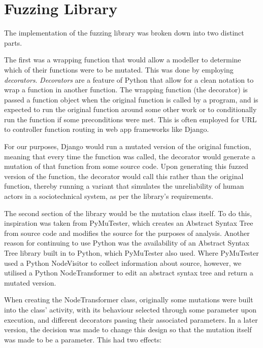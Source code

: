 \section{Fuzzing Library}
\label{planning_fuzzing_implementation} %
The implementation of the fuzzing library was broken down into two distinct parts. \par
The first was a wrapping function that would allow a modeller to determine which of their functions were to be mutated. This was done by employing \emph{decorators}. \emph{Decorators} are a feature of Python that allow for a clean notation to wrap a function in another function. The wrapping function (the decorator) is passed a function object when the original function is called by a program, and is expected to run the original function around some other work or to conditionally run the function if some preconditions were met. This is often employed for URL to controller function routing in web app frameworks like Django. \par%
For our purposes, Django would run a mutated version of the original function, meaning that every time the function was called, the decorator would generate a mutation of that function from some source code. Upon generating this fuzzed version of the function, the decorator would call this rather than the original function, thereby running a variant that simulates the unreliability of human actors in a sociotechnical system, as per the library's requirements. \par
The second section of the library would be the mutation class itself. To do this, inspiration was taken from PyMuTester, which creates an Abstract Syntax Tree from source code and modifies the source for the purposes of analysis. Another reason for continuing to use Python was the availability of an Abstract Syntax Tree library built in to Python, which PyMuTester also used. Where PyMuTester used a Python NodeVisitor to collect information about source, however, we utilised a Python NodeTransformer to edit an abstract syntax tree and return a mutated version. \par%
When creating the NodeTransformer class, originally some mutations were built into the class' activity, with its behaviour selected through some parameter upon execution, and different decorators passing their associated parameters. In a later version, the decision was made to change this design so that the mutation itself was made to be a parameter. This had two effects: 
